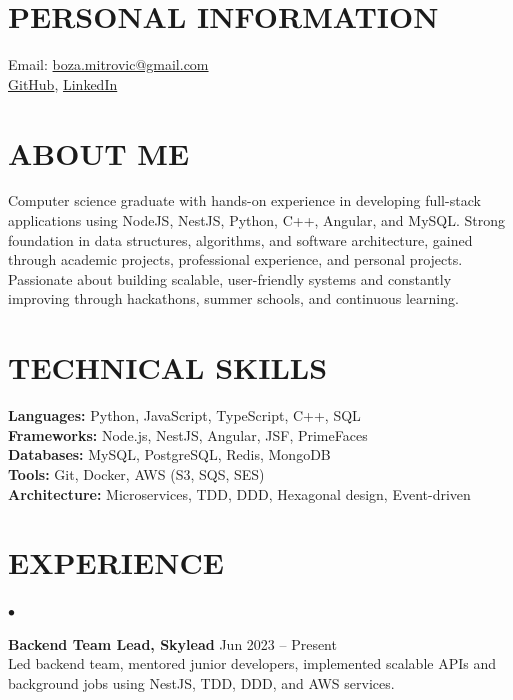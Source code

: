 \documentclass[margin,center]{res}
\newenvironment{list1}{
  \begin{list}{$\bullet$}{
      \setlength{\itemsep}{0in}
      \setlength{\parsep}{0in}
      \setlength{\parskip}{0in}
      \setlength{\topsep}{0in}
      \setlength{\partopsep}{0in}
      \setlength{\leftmargin}{0.17in}}}{\end{list}}
\begin{document}
\begin{figure}
\hfill{}\vspace*{-1cm}
\end{figure}

\begin{resume}

\section{PERSONAL INFORMATION}
Email: \href{mailto:boza.mitrovic@gmail.com}{boza.mitrovic@gmail.com} \\
\href{https://github.com/AizenAngel}{GitHub}, \href{https://www.linkedin.com/in/bo%C5%BEidar-mitrovi%C4%87-1a379991/}{LinkedIn}

\section{ABOUT ME}
Computer science graduate with hands-on experience in developing full-stack applications using NodeJS, NestJS, Python, C++, Angular, and MySQL. Strong foundation in data structures, algorithms, and software architecture, gained through academic projects, professional experience, and personal projects. Passionate about building scalable, user-friendly systems and constantly improving through hackathons, summer schools, and continuous learning.

\section{TECHNICAL SKILLS}
\textbf{Languages:} Python, JavaScript, TypeScript, C++, SQL \\
\textbf{Frameworks:} Node.js, NestJS, Angular, JSF, PrimeFaces \\
\textbf{Databases:} MySQL, PostgreSQL, Redis, MongoDB \\
\textbf{Tools:} Git, Docker, AWS (S3, SQS, SES) \\
\textbf{Architecture:} Microservices, TDD, DDD, Hexagonal design, Event-driven

\section{EXPERIENCE}
\begin{list1}
\item \textbf{Backend Team Lead, Skylead} \hfill Jun 2023 -- Present \\
Led backend team, mentored junior developers, implemented scalable APIs and background jobs using NestJS, TDD, DDD, and AWS services.


\end{list1}
\end{resume}
\end{document}

